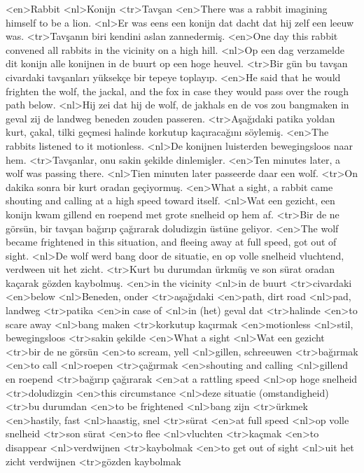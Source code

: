 <en>Rabbit 
<nl>Konijn 
<tr>Tavşan
<en>There was a rabbit imagining himself to be a lion. 
<nl>Er was eens een konijn dat dacht dat hij zelf een leeuw was. 
<tr>Tavşanın biri kendini aslan zannedermiş. 
<en>One day this rabbit convened all rabbits in the vicinity on a high hill.
<nl>Op een dag verzamelde dit konijn alle konijnen in de buurt op een hoge heuvel.
<tr>Bir gün bu tavşan civardaki tavşanları yüksekçe bir tepeye toplayıp.
<en>He said that he would frighten the wolf, the jackal, and the fox in case they would pass over the rough path below.
<nl>Hij zei dat hij de wolf, de jakhals en de vos zou bangmaken in geval zij  de landweg beneden zouden passeren. 
<tr>Aşağıdaki patika yoldan kurt, çakal, tilki geçmesi halinde korkutup kaçıracağını söylemiş. 
<en>The rabbits listened to it motionless.
<nl>De konijnen luisterden  bewegingsloos naar hem.
<tr>Tavşanlar, onu sakin şekilde dinlemişler.
<en>Ten minutes later, a wolf was passing there.
<nl>Tien minuten later passeerde daar een wolf.
<tr>On dakika sonra bir kurt oradan geçiyormuş.
<en>What a sight,  a rabbit came shouting and calling at a high speed toward itself. 
<nl>Wat een gezicht, een konijn kwam gillend en roepend met grote snelheid op hem af.
<tr>Bir de ne görsün, bir tavşan bağırıp çağırarak doludizgin üstüne geliyor.
<en>The wolf became  frightened in this situation, and fleeing away at full speed, got out of sight.
<nl>De wolf werd bang door de situatie, en  op volle snelheid vluchtend,  verdween uit het zicht.
<tr>Kurt bu durumdan ürkmüş ve son sürat oradan kaçarak gözden kaybolmuş.
<en>in the vicinity
<nl>in de buurt
<tr>civardaki
<en>below
<nl>Beneden, onder 
<tr>aşağıdaki
<en>path, dirt road
<nl>pad, landweg
<tr>patika
<en>in case of
<nl>in (het) geval dat
<tr>halinde
<en>to scare away
<nl>bang maken
<tr>korkutup kaçırmak
<en>motionless
<nl>stil, bewegingsloos
<tr>sakin şekilde
<en>What a sight
<nl>Wat een gezicht
<tr>bir de ne görsün
<en>to scream, yell
<nl>gillen, schreeuwen
<tr>bağırmak
<en>to call
<nl>roepen
<tr>çağırmak
<en>shouting and calling
<nl>gillend en roepend 
<tr>bağırıp çağırarak
<en>at a rattling speed
<nl>op hoge snelheid
<tr>doludizgin
<en>this circumstance
<nl>deze situatie (omstandigheid)
<tr>bu durumdan
<en>to be frightened
<nl>bang zijn
<tr>ürkmek
<en>hastily, fast
<nl>haastig, snel
<tr>sürat
<en>at full speed
<nl>op volle snelheid
<tr>son sürat
<en>to flee 
<nl>vluchten
<tr>kaçmak
<en>to disappear 
<nl>verdwijnen
<tr>kaybolmak
<en>to get out of sight
<nl>uit het zicht verdwijnen
<tr>gözden kaybolmak
